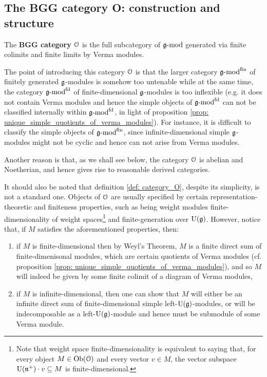     \subsection{The BGG category O: construction and structure}
        \begin{definition} \label{def: category_O}
            The \textbf{BGG category $\mathcal{O}$} is the full subcategory of $\mathfrak{g}\text{-}\mathrm{mod}$ generated via finite colimits and finite limits by Verma modules. 
        \end{definition}
        \begin{remark}
            The point of introducing this category $\mathcal{O}$ is that the larger category $\mathfrak{g}\text{-}\mathrm{mod}^{\mathrm{fin}}$ of finitely generated $\mathfrak{g}$-modules is somehow too untenable while at the same time, the category $\mathfrak{g}\text{-}\mathrm{mod}^{\mathrm{fd}}$ of finite-dimensional $\mathfrak{g}$-modules is too inflexible (e.g. it does not contain Verma modules and hence the simple objects of $\mathfrak{g}\text{-}\mathrm{mod}^{\mathrm{fd}}$ can not be classified internally within $\mathfrak{g}\text{-}\mathrm{mod}^{\mathrm{fd}}$, in light of proposition \ref{prop: unique_simple_quotients_of_verma_modules}). For instance, it is difficult to classify the simple objects of $\mathfrak{g}\text{-}\mathrm{mod}^{\mathrm{fin}}$, since infinite-dimensional simple $\mathfrak{g}$-modules might not be cyclic and hence can not arise from Verma modules. 

            Another reason is that, as we shall see below, the category $\mathcal{O}$ is abelian and Noetherian, and hence gives rise to reasonable derived categories. 
        \end{remark}
        \begin{remark}
            It should also be noted that definition \ref{def: category_O}, despite its simplicity, is not a standard one. Objects of $\mathcal{O}$ are usually specified by certain representation-theoretic and finiteness properties, such as being weight modules finite-dimensionality of weight spaces\footnote{Note that weight space finite-dimensionality is equivalent to saying that, for every object $M \in \mathrm{Ob}(\mathcal{O})$ and every vector $v \in M$, the vector subspace $\mathrm{U}(\mathfrak{n}^+) \cdot v \subseteq M$ is finite-dimensional.} and finite-generation over $\mathrm{U}(\mathfrak{g})$. However, notice that, if $M$ satisfies the aforementioned properties, then:
            \begin{enumerate}
                \item if $M$ is finite-dimensional then by Weyl's Theorem, $M$ is a finite direct sum of finite-dimenisonal modules, which are certain quotients of Verma modules (cf. proposition \ref{prop: unique_simple_quotients_of_verma_modules}), and so $M$ will indeed be given by some finite colimit of a diagram of Verma modules,
                \item if $M$ is infinite-dimensional, then one can show that $M$ will either be an infinite direct sum of finite-dimensional simple left-$\mathrm{U}(\mathfrak{g})$-modules, or will be indecomposable as a left-$\mathrm{U}(\mathfrak{g})$-module and hence must be submodule of some Verma module.
            \end{enumerate}
            
        \end{remark}

